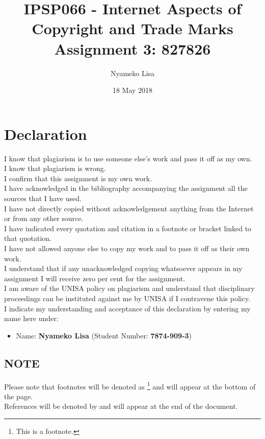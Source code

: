 \documentclass[11pt]{article}
\author{Nyameko Lisa}
\date{18 May 2018}
\title{IPSP066 - Internet Aspects of Copyright and Trade Marks\\\medskip
\large Assignment 3: 827826}
\begin{document}
\maketitle
\addvspace{110pt}

\justifying
\addvspace{110pt}
\section*{Declaration}
\label{sec:org4324d9c}
I know that plagiarism is to use someone else’s work and pass it off as my own.\\
I know that plagiarism is wrong.\\
I confirm that this assignment is my own work.\\
I have acknowledged in the bibliography accompanying the assignment all the sources that I have used.\\
I have not directly copied without acknowledgement anything from the Internet or from any other source.\\
I have indicated every quotation and citation in a footnote or bracket linked to that quotation.\\
I have not allowed anyone else to copy my work and to pass it off as their own work.\\
I understand that if any unacknowledged copying whatsoever appears in my assignment I will receive zero per cent for the assignment.\\
I am aware of the UNISA policy on plagiarism and understand that disciplinary proceedings can be instituted against me by UNISA if I contravene this policy.\\
I indicate my understanding and acceptance of this declaration by
entering my name here under:
\begin{itemize}
\item Name: \textbf{Nyameko Lisa} (Student Number: \textbf{7874-909-3})
\end{itemize}

\subsection*{NOTE}
\label{sec:org02e5544}
Please note that footnotes will be denoted as \footnote{This is a footnote.} and will
appear at the bottom of the page.\\
References will be denoted by \cite{rsa93_tm_act} and will appear at the end of the document.
\newpage
\end{document}
